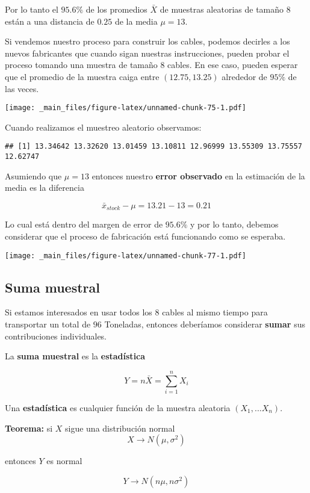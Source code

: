 \documentclass[
]{book}
\begin{document}
Por lo tanto el \(95.6\%\) de los promedios \(\bar{X}\) de muestras aleatorias de tamaño \(8\) están a una distancia de \(0.25\) de la media \(\mu=13\).

Si vendemos nuestro proceso para construir los cables, podemos decirles a los nuevos fabricantes que cuando sigan nuestras instrucciones, pueden probar el proceso tomando una muestra de tamaño \(8\) cables. En ese caso, pueden esperar que el promedio de la muestra caiga entre \((12.75, 13.25)\) alrededor de \(95\%\) de las veces.

\texttt{[image: \_main\_files/figure-latex/unnamed-chunk-75-1.pdf]}

Cuando realizamos el muestreo aleatorio observamos:

\begin{verbatim}
## [1] 13.34642 13.32620 13.01459 13.10811 12.96999 13.55309 13.75557 12.62747
\end{verbatim}

Asumiendo que \(\mu=13\) entonces nuestro \textbf{error observado} en la estimación de la media es la diferencia

\[\bar{x}_{stock}-\mu=13.21-13=0.21\]

Lo cual está dentro del margen de error de \(95.6\%\) y por lo tanto, debemos considerar que el proceso de fabricación está funcionando como se esperaba.

\texttt{[image: \_main\_files/figure-latex/unnamed-chunk-77-1.pdf]}

\hypertarget{suma-muestral}{%
\subsection{Suma muestral}\label{suma-muestral}}

Si estamos interesados en usar todos los \(8\) cables al mismo tiempo para transportar un total de \(96\) Toneladas, entonces deberíamos considerar \textbf{sumar} sus contribuciones individuales.

La \textbf{suma muestral} es la \textbf{estadística}

\[Y=n \bar{X}=\sum_{i=1}^n X_i\]

Una \textbf{estadística} es cualquier función de la muestra aleatoria \((X_1, ... X_n)\).

\textbf{Teorema:} si \(X\) sigue una distribución normal
\[X \rightarrow N(\mu, \sigma^2)\]

entonces \(Y\) es normal

\[Y \rightarrow N(n\mu, n\sigma^2)\]
\end{document}
